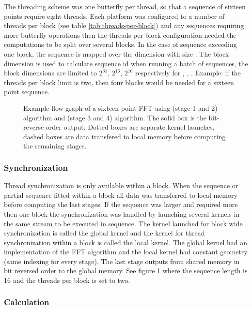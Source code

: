 The threading scheme was one butterfly per thread, so that a sequence of sixteen points require eight threads. Each platform was configured to a number of threads per block (see table \ref{tab:threads-per-block}) and any sequences requiring more butterfly operations then the threads per block configuration needed the computations to be split over several blocks. In the case of sequence exceeding one block, the sequence is mapped over the  dimension with size . The block dimension  is used to calculate sequence id when running a batch of sequences, the block dimensions are limited to $2^{31}$, $2^{16}$, $2^{16}$ respectively for , , . Example: if the threads per block limit is two, then four blocks would be needed for a sixteen point sequence.

\begin{figure}[htbp]
	
	\caption{Example flow graph of a sixteen-point \gls{FFT} using (stage 1 and 2) {\CTALG} algorithm and (stage 3 and 4) {\CGALG} algorithm. The solid box is the bit-reverse order output. Dotted boxes are separate kernel launches, dashed boxes are data transfered to local memory before computing the remaining stages.}
	\label{fig:flowgraph-16}
\end{figure}

\subsubsection{Synchronization}

Thread synchronization is only available within a block. When the sequence or partial sequence fitted within a block all data was transferred to local memory before computing the last stages. If the sequence was larger and required more then one block the synchronization was handled by launching several kernels in the same stream to be executed in sequence. The kernel launched for block wide synchronization is called the global kernel and the kernel for thread synchronization within a block is called the local kernel. The global kernel had an implementation of the {\CTALG} \gls{FFT} algorithm and the local kernel had constant geometry (same indexing for every stage). The last stage outputs from shared memory in bit reversed order to the global memory. See figure \ref{fig:flowgraph-16} where the sequence length is 16 and the threads per block is set to two.

\subsubsection{Calculation}

